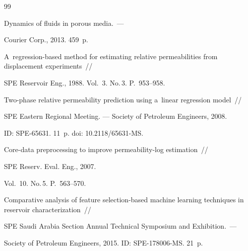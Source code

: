 {\small\frenchspacing

{%


\begin{thebibliography}{99}



Dynamics of fluids in porous media.~---

 Courier Corp., 2013. 459~p.

    

   



 A~regression-based method for estimating relative permeabilities from displacement experiments~/\!\!/ 

 SPE Reservoir Eng., 1988. Vol.~3. No.\,3. P.~953--958.

 



Two-phase relative permeability prediction using a~linear regression model~/\!\!/ 

SPE Eastern Regional Meeting. --- Society of Petroleum Engineers, 2008. 

ID: SPE-65631. 11~p. doi: 10.2118/65631-MS.



    



Core-data preprocessing to improve permeability-log estimation~/\!\!/ 

SPE Reserv. Eval. Eng., 2007. 

Vol.~10. No.\,5. P.~563--570.

    



Comparative analysis of feature selection-based machine learning techniques in reservoir characterization~/\!\!/ 

SPE Saudi Arabia Section Annual Technical Symposium and Exhibition.~--- 

Society of Petroleum Engineers, 2015. ID: SPE-178006-MS. 21~p.


\end{thebibliography}}}
